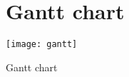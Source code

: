 \chapter{Gantt chart}
\begin{table}
\centering
\texttt{[image: gantt]}
\caption{\label{tab:gantt}Gantt chart}
\end{table}